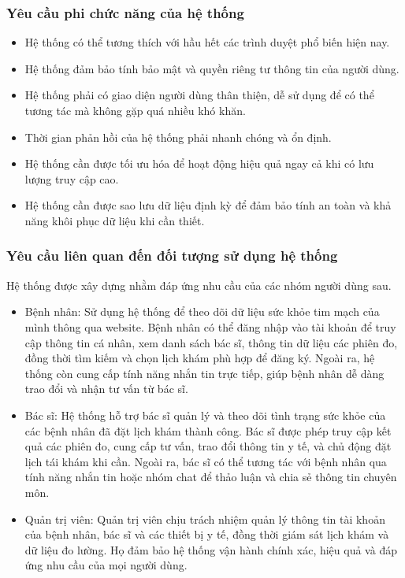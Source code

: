 \subsubsection{Yêu cầu phi chức năng của hệ thống}
\begin{itemize}
	\item Hệ thống có thể tương thích với hầu hết các trình duyệt phổ biến hiện nay.
	\item Hệ thống đảm bảo tính bảo mật và quyền riêng tư thông tin của người dùng.
	\item Hệ thống phải có giao diện người dùng thân thiện, dễ sử dụng để có thể tương tác mà không gặp quá nhiều khó khăn.
	\item Thời gian phản hồi của hệ thống phải nhanh chóng và ổn định.
	\item Hệ thống cần được tối ưu hóa để hoạt động hiệu quả ngay cả khi có lưu lượng truy cập cao.
	\item Hệ thống cần được sao lưu dữ liệu định kỳ để đảm bảo tính an toàn và khả năng khôi phục dữ liệu khi cần thiết.
\end{itemize}

\subsubsection{Yêu cầu liên quan đến đối tượng sử dụng hệ thống}
Hệ thống được xây dựng nhằm đáp ứng nhu cầu của các nhóm người dùng sau.
\begin{adjustwidth}{1.5em}{}
	\begin{itemize}
		\item Bệnh nhân: Sử dụng hệ thống để theo dõi dữ liệu sức khỏe tim mạch của mình thông qua website.
		      Bệnh nhân có thể đăng nhập vào tài khoản để truy cập thông tin cá nhân, xem danh sách bác sĩ, thông tin dữ liệu các phiên đo, đồng thời tìm kiếm và chọn lịch khám phù hợp để đăng ký.
		      Ngoài ra, hệ thống còn cung cấp tính năng nhắn tin trực tiếp, giúp bệnh nhân dễ dàng trao đổi và nhận tư vấn từ bác sĩ.

		\item Bác sĩ: Hệ thống hỗ trợ bác sĩ quản lý và theo dõi tình trạng sức khỏe của các bệnh nhân đã đặt lịch khám thành công.
		      Bác sĩ được phép truy cập kết quả các phiên đo, cung cấp tư vấn, trao đổi thông tin y tế, và chủ động đặt lịch tái khám khi cần.
		      Ngoài ra, bác sĩ có thể tương tác với bệnh nhân qua tính năng nhắn tin hoặc nhóm chat để thảo luận và chia sẻ thông tin chuyên môn.

		\item Quản trị viên: Quản trị viên chịu trách nhiệm quản lý thông tin tài khoản của bệnh nhân, bác sĩ và các thiết bị y tế, đồng thời giám sát lịch khám và dữ liệu đo lường.
		      Họ đảm bảo hệ thống vận hành chính xác, hiệu quả và đáp ứng nhu cầu của mọi người dùng.
	\end{itemize}
\end{adjustwidth}

